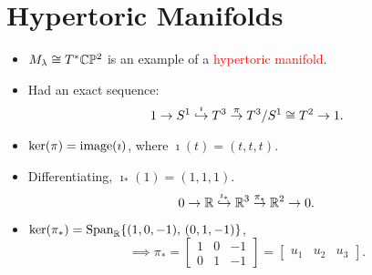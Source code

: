 \section{Hypertoric Manifolds}

\begin{frame}
    \begin{itemize}
        \item $M_{\lambda} \cong T^{\ast}\mathbb{C}\mathbb{P}^{2}$ is an example of a \textcolor{red}{hypertoric manifold}.\
        \item Had an exact sequence:
        \[
            1 \rightarrow S^{1} \overset{\imath}{\hookrightarrow} T^{3} \overset{\pi}{\rightarrow} T^{3}/S^{1} \cong T^{2} \rightarrow 1.    
        \]
        \item $\ker(\pi) = \operatorname{image}(\imath)$, where $\imath(t) = (t,t,t)$.
        \item Differentiating, $\imath_{\ast}(1) = (1,1,1)$.
        \[
            0 \rightarrow \mathbb{R} \overset{\imath_{\ast}}{\hookrightarrow} \mathbb{R}^{3} \overset{\pi_{\ast}}{\rightarrow} \mathbb{R}^{2} \rightarrow 0.    
        \]
        \item $\ker(\pi_{\ast}) = \text{Span}_{\mathbb{R}}\{(1,0,-1),\, (0,1,-1)\}$,
        \[
        \implies \pi_{\ast} = \begin{bmatrix} 1 & 0 & -1 \\ 0 & 1 & -1 \end{bmatrix} = \begin{bmatrix} u_{1} & u_{2} & u_{3} \end{bmatrix}.
        \]
    \end{itemize}
\end{frame}

